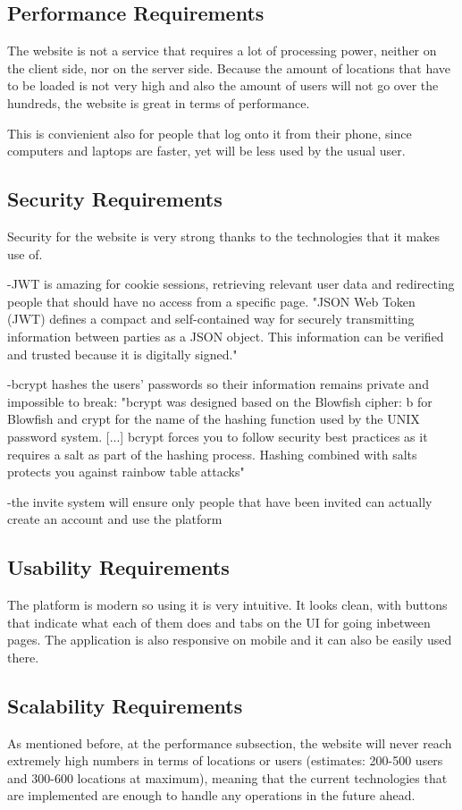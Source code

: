 \documentclass[12pt,a4paper]{report}
\begin{document}
\subsection{Performance Requirements}
The website is not a service that requires a lot of processing power, neither on the client side, nor on the server side. Because the amount of locations that have to be loaded is not very high and also the amount of users will not go over the hundreds, the website is great in terms of performance.

This is convienient also for people that log onto it from their phone, since computers and laptops are faster, yet will be less used by the usual user.

\subsection{Security Requirements}
Security for the website is very strong thanks to the technologies that it makes use of.

-JWT is amazing for cookie sessions, retrieving relevant user data and redirecting people that should have no access from a specific page.
"JSON Web Token (JWT) defines a compact and self-contained way for securely transmitting information between parties as a JSON object. This information can be verified and trusted because it is digitally signed."~\cite{JWT}

-bcrypt hashes the users' passwords so their information remains private and impossible to break:
"bcrypt was designed based on the Blowfish cipher: b for Blowfish and crypt for the name of the hashing function used by the UNIX password system. [...] bcrypt forces you to follow security best practices as it requires a salt as part of the hashing process. Hashing combined with salts protects you against rainbow table attacks"~\cite{bcrypt}

-the invite system will ensure only people that have been invited can actually create an account and use the platform

\subsection{Usability Requirements}
The platform is modern so using it is very intuitive. It looks clean, with buttons that indicate what each of them does and tabs on the UI for going inbetween pages. The application is also responsive on mobile and it can also be easily used there.

\subsection{Scalability Requirements}
As mentioned before, at the performance subsection, the website will never reach extremely high numbers in terms of locations or users (estimates: 200-500 users and 300-600 locations at maximum), meaning that the current technologies that are implemented are enough to handle any operations in the future ahead.
\end{document}
